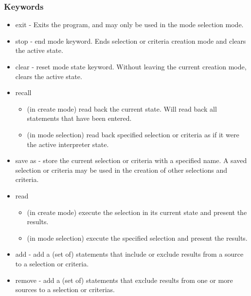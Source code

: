\subsubsection{Keywords}
\begin{itemize}
\item exit - Exits the program, and may only be used in the mode selection mode.
\item stop - end mode keyword. Ends selection or criteria creation mode and clears the active state.
\item clear - reset mode state keyword. Without leaving the current creation mode, clears the active state.
\item recall 
    \begin{itemize}
    \item (in create mode) read back the current state. Will read back all statements that have been entered.
    \item (in mode selection) read back specified selection or criteria as if it were the active interpreter state.
    \end{itemize}
\item save as - store the current selection or criteria with a specified name. A saved selection or criteria may be used in the creation of other selections and criteria.
\item read
    \begin{itemize}
    \item (in create mode) execute the selection in its current state and present the results.
    \item (in mode selection) execute the specified selection and present the results.
    \end{itemize}
\item add - add a (set of) statements that include or exclude results from a source to a selection or criteria.
\item remove - add a (set of) statements that exclude results from one or more sources to a selection or criterias.
\end{itemize}
